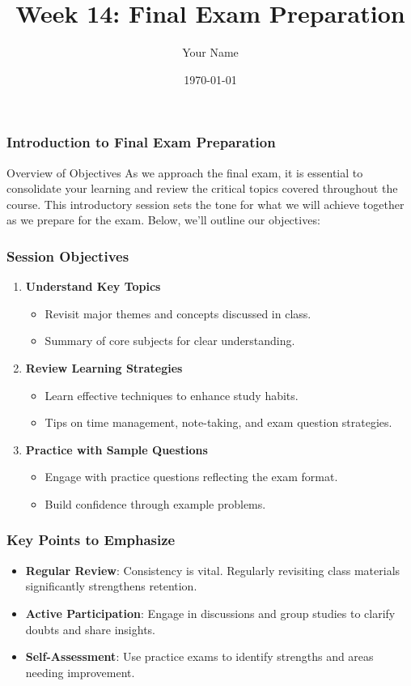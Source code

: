 \documentclass{beamer}
\title{Week 14: Final Exam Preparation}
\author{Your Name}
\institute{Your Institution}
\date{\today}
\begin{document}
\frame{\titlepage}

\begin{frame}[fragile]
    \frametitle{Introduction to Final Exam Preparation}
    \begin{block}{Overview of Objectives}
        As we approach the final exam, it is essential to consolidate your learning and review the critical topics covered throughout the course. This introductory session sets the tone for what we will achieve together as we prepare for the exam. Below, we'll outline our objectives:
    \end{block}
\end{frame}

\begin{frame}[fragile]
    \frametitle{Session Objectives}
    \begin{enumerate}
        \item \textbf{Understand Key Topics}
        \begin{itemize}
            \item Revisit major themes and concepts discussed in class.
            \item Summary of core subjects for clear understanding.
        \end{itemize}
        
        \item \textbf{Review Learning Strategies}
        \begin{itemize}
            \item Learn effective techniques to enhance study habits.
            \item Tips on time management, note-taking, and exam question strategies.
        \end{itemize}
        
        \item \textbf{Practice with Sample Questions}
        \begin{itemize}
            \item Engage with practice questions reflecting the exam format.
            \item Build confidence through example problems.
        \end{itemize}
    \end{enumerate}
\end{frame}

\begin{frame}[fragile]
    \frametitle{Key Points to Emphasize}
    \begin{itemize}
        \item \textbf{Regular Review}: Consistency is vital. Regularly revisiting class materials significantly strengthens retention.
        \item \textbf{Active Participation}: Engage in discussions and group studies to clarify doubts and share insights.
        \item \textbf{Self-Assessment}: Use practice exams to identify strengths and areas needing improvement.
    \end{itemize}
\end{frame}
\end{document}
